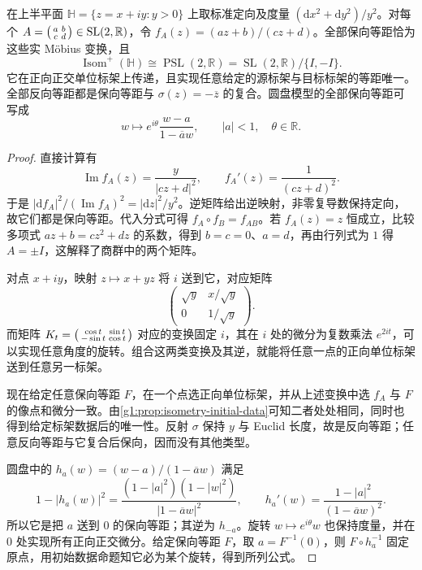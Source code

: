 \begin{theorem}
	\label{g1:thm:hyperbolic-isometry-group}
	在上半平面 \(\mathbb H=\{z=x+iy:y>0\}\) 上取标准定向及度量 \((\mathrm dx^2+\mathrm dy^2)/y^2\)。对每个 \(A=\begin{psmallmatrix}a&b\\c&d\end{psmallmatrix}\in\operatorname{SL}(2,\mathbb R)\)，令 \(f_A(z)=(az+b)/(cz+d)\)。全部保向等距恰为这些实 Möbius 变换，且
	\[
		\operatorname{Isom}^+(\mathbb H)
		\cong\operatorname{PSL}(2,\mathbb R)
		=\operatorname{SL}(2,\mathbb R)/\{I,-I\}.
	\]
	它在正向正交单位标架上传递，且实现任意给定的源标架与目标标架的等距唯一。全部反向等距都是保向等距与 \(\sigma(z)=-\overline z\) 的复合。圆盘模型的全部保向等距可写成
	\[
		w\longmapsto e^{i\theta}\frac{w-a}{1-\overline a w},\qquad |a|<1,\quad\theta\in\mathbb R.
	\]
\end{theorem}
\begin{proof}
	直接计算有
	\[
		\operatorname{Im}f_A(z)=\frac{y}{|cz+d|^2},\qquad
		f_A'(z)=\frac1{(cz+d)^2}.
	\]
	于是 \(|\mathrm{d}f_A|^2/(\operatorname{Im}f_A)^2=|\mathrm{d}z|^2/y^2\)。逆矩阵给出逆映射，非零复导数保持定向，故它们都是保向等距。代入分式可得 \(f_A\circ f_B=f_{AB}\)。若 \(f_A(z)=z\) 恒成立，比较多项式 \(az+b=cz^2+dz\) 的系数，得到 \(b=c=0\)、\(a=d\)，再由行列式为 \(1\) 得 \(A=\pm I\)，这解释了商群中的两个矩阵。

	对点 \(x+iy\)，映射 \(z\mapsto x+yz\) 将 \(i\) 送到它，对应矩阵
	\[
		\begin{pmatrix}\sqrt y&x/\sqrt y\\0&1/\sqrt y\end{pmatrix}.
	\]
	而矩阵 \(K_t=\begin{psmallmatrix}\cos t&\sin t\\-\sin t&\cos t\end{psmallmatrix}\) 对应的变换固定 \(i\)，其在 \(i\) 处的微分为复数乘法 \(e^{2it}\)，可以实现任意角度的旋转。组合这两类变换及其逆，就能将任意一点的正向单位标架送到任意另一标架。

	现在给定任意保向等距 \(F\)，在一个点选正向单位标架，并从上述变换中选 \(f_A\) 与 \(F\) 的像点和微分一致。由\cref{g1:prop:isometry-initial-data}可知二者处处相同，同时也得到给定标架数据后的唯一性。反射 \(\sigma\) 保持 \(y\) 与 Euclid 长度，故是反向等距；任意反向等距与它复合后保向，因而没有其他类型。

	圆盘中的 \(h_a(w)=(w-a)/(1-\overline a w)\) 满足
	\[
		1-|h_a(w)|^2=\frac{(1-|a|^2)(1-|w|^2)}{|1-\overline a w|^2},\qquad
		h_a'(w)=\frac{1-|a|^2}{(1-\overline a w)^2}.
	\]
	所以它是把 \(a\) 送到 \(0\) 的保向等距；其逆为 \(h_{-a}\)。旋转 \(w\mapsto e^{i\theta}w\) 也保持度量，并在 \(0\) 处实现所有正向正交微分。给定保向等距 \(F\)，取 \(a=F^{-1}(0)\)，则 \(F\circ h_a^{-1}\) 固定原点，用初始数据命题知它必为某个旋转，得到所列公式。
\end{proof}

